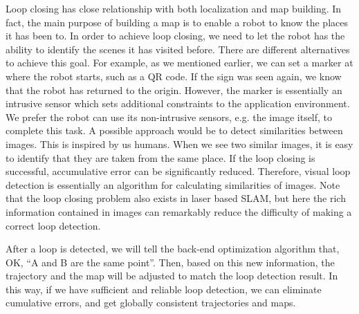 Loop closing has close relationship with both localization and map building. In fact, the main purpose of building a map is to enable a robot to know the places it has been to. In order to achieve loop closing, we need to let the robot has the ability to identify the scenes it has visited before. There are different alternatives to achieve this goal. For example, as we mentioned earlier, we can set a marker at where the robot starts, such as a QR code. If the sign was seen again, we know that the robot has returned to the origin. However, the marker is essentially an intrusive sensor which sets additional constraints to the application environment. We prefer the robot can use its non-intrusive sensors, e.g. the image itself, to complete this task. A possible approach would be to detect similarities between images. This is inspired by us humans. When we see two similar images, it is easy to identify that they are taken from the same place. If the loop closing is successful, accumulative error can be significantly reduced. Therefore, visual loop detection is essentially an algorithm for calculating similarities of images. Note that the loop closing problem also exists in laser based SLAM, but here the rich information contained in images can remarkably reduce the difficulty of making a correct loop detection.

After a loop is detected, we will tell the back-end optimization algorithm that, OK,  ``A and B are the same point''. Then, based on this new information, the trajectory and the map will be adjusted to match the loop detection result. In this way, if we have sufficient and reliable loop detection, we can eliminate cumulative errors, and get globally consistent trajectories and maps.

